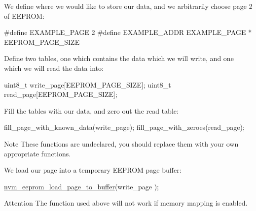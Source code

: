\begin{DoxyEnumerate}
\item We define where we would like to store our data, and we arbitrarily choose page 2 of E\-E\-P\-R\-O\-M\-:
\begin{DoxyItemize}
\item 
\begin{DoxyCode}
\textcolor{preprocessor}{        #define EXAMPLE\_PAGE 2}
\textcolor{preprocessor}{        #define EXAMPLE\_ADDR EXAMPLE\_PAGE * EEPROM\_PAGE\_SIZE}
\end{DoxyCode}

\end{DoxyItemize}
\item Define two tables, one which contains the data which we will write, and one which we will read the data into\-:
\begin{DoxyItemize}
\item 
\begin{DoxyCode}
        uint8\_t write\_page[EEPROM\_PAGE\_SIZE];
        uint8\_t read\_page[EEPROM\_PAGE\_SIZE];
\end{DoxyCode}

\end{DoxyItemize}
\item Fill the tables with our data, and zero out the read table\-:
\begin{DoxyItemize}
\item 
\begin{DoxyCode}
        fill\_page\_with\_known\_data(write\_page);
        fill\_page\_with\_zeroes(read\_page);
\end{DoxyCode}

\item \begin{DoxyNote}{Note}
These functions are undeclared, you should replace them with your own appropriate functions.
\end{DoxyNote}

\end{DoxyItemize}
\item We load our page into a temporary E\-E\-P\-R\-O\-M page buffer\-:
\begin{DoxyItemize}
\item 
\begin{DoxyCode}
        \hyperlink{group__nvm__eeprom__group_ga02f10adbf959b8525bbaf777ad6e43b6}{nvm\_eeprom\_load\_page\_to\_buffer}(write\_page
      );
\end{DoxyCode}

\item \begin{DoxyAttention}{Attention}
The function used above will not work if memory mapping is enabled.
\end{DoxyAttention}


\end{DoxyItemize}
\end{DoxyEnumerate}
